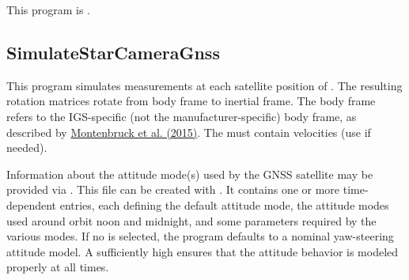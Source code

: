This program is .
\clearpage
\subsection{SimulateStarCameraGnss}\label{SimulateStarCameraGnss}
This program simulates  measurements at each satellite position
of .
The resulting rotation matrices rotate from body frame to inertial frame. The body frame refers
to the IGS-specific (not the manufacturer-specific) body frame, as described by
\href{https://doi.org/10.1016/j.asr.2015.06.019}{Montenbruck et al. (2015)}.
The  must contain velocities
(use  if needed).

Information about the attitude mode(s) used by the GNSS satellite may be provided via
. This file can be created with
. It contains one or more time-dependent entries,
each defining the default attitude mode, the attitude modes used around orbit noon and
midnight, and some parameters required by the various modes.
If no  is selected, the program defaults
to a nominal yaw-steering attitude model.
A sufficiently high  ensures that the attitude behavior is modeled properly
at all times.

